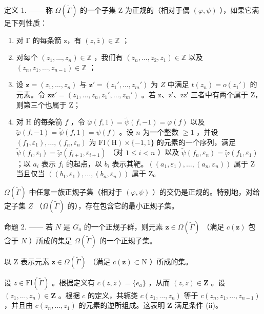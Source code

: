 定义 1. —— 称 \(\Omega(\widetilde{\Gamma})\) 的一个子集 Z 为正规的（相对于偶 \((\varphi, \psi)\) ），如果它满足下列性质：

\begin{enumerate}
\def\labelenumi{(\roman{enumi})}
\item
  对 Γ 的每条箭 z，有 \((z,\overline{z})\in\mathbb{Z}\) ；
\item
  对每个 \((z_{1},\ldots ,z_{n})\in \mathbb{Z}\) ，我们有 \((\overline{z}_n,\dots ,\overline{z}_2,\overline{z}_1)\in \mathbb{Z}\) 以及 \((z_{n},z_{1},\ldots ,z_{n - 1})\in \mathbb{Z}\) ；
\item
  设 \(\mathbf{z} = (z_1, \ldots, z_n)\) 与 \(\mathbf{z}' = (z_1', \ldots, z_m')\) 为 \(Z\) 中满足 \(t(z_n) = o(z_1')\) 的元素。令 \(\mathbf{z}\mathbf{z}' = (z_1, \ldots, z_n, z_1', \ldots, z_m')\) 。若 z、z′、zz′ 三者中有两个属于 Z，则第三个也属于 Z；
\item
  对 H 的每条箭 \(f\) ，令 \(\widetilde{\varphi}(f,1) = \widetilde{\psi}(f,-1) = \varphi(f)\) 以及 \(\widetilde{\varphi}(f,-1) = \widetilde{\psi}(f,1) = \psi(f)\) 。设 \(n\) 为一个整数 \(\geqslant 1\) ，并设 \((f_1,\varepsilon_1),\ldots,(f_n,\varepsilon_n)\) 为 \(\mathrm{Fl}(\mathrm{H})\times \{-1,1\}\) 的元素的一个序列，满足 \(\widetilde{\psi}(f_i,\varepsilon_i) = \widetilde{\varphi}(f_{i+1},\varepsilon_{i+1})\) （对 \(1\leqslant i < n\) ）以及 \(\widetilde{\psi}(f_n,\varepsilon_n) = \widetilde{\varphi}(f_1,\varepsilon_1)\) ；以 \(a_i\) 表示 \(f_i\) 的起点，以 \(b_i\) 表示其靶。\(((a_1,\varepsilon_1),\ldots,(a_n,\varepsilon_n))\) 属于 Z 当且仅当 \(((b_1,\varepsilon_1),\ldots,(b_n,\varepsilon_n))\) 属于 Z。
\end{enumerate}

\(\Omega(\widetilde{\Gamma})\) 中任意一族正规子集（相对于 \((\varphi, \psi)\) ）的交仍是正规的。特别地，对给定子集 \(Z\) （\(\Omega(\widetilde{\Gamma})\) 的），存在包含它的最小正规子集。

命题 2. —— 若 \(N\) 是 \(G_{a}\) 的一个正规子群，则元素 \(\mathbf{z} \in \Omega(\widetilde{\Gamma})\) （满足 \(c(\mathbf{z})\) 包含于 \(N\) ）所成的集是 \(\Omega(\widetilde{\Gamma})\) 的一个正规子集。

以 Z 表示元素 \(\mathbf{z} \in \Omega(\widetilde{\Gamma})\) （满足 \(c(\mathbf{z}) \subset \mathrm{N}\) ）所成的集。

设 \(z \in \mathrm{Fl}(\widetilde{\Gamma})\) 。根据定义有 \(c(z, \overline{z}) = \{e_a\}\) ，从而 \((z, \overline{z}) \in \mathbf{Z}\) 。设 \((z_1, \ldots, z_n) \in \mathbf{Z}\) 。根据 \(c\) 的定义，共轭类 \(c(z_1, \ldots, z_n)\) 等于 \(c(z_n, z_1, \ldots, z_{n-1})\) ，并且由 \(c(\overline{z}_n, \ldots, \overline{z}_1)\) 的元素的逆所组成。这表明 \(\mathbf{Z}\) 满足条件 (ii)。


